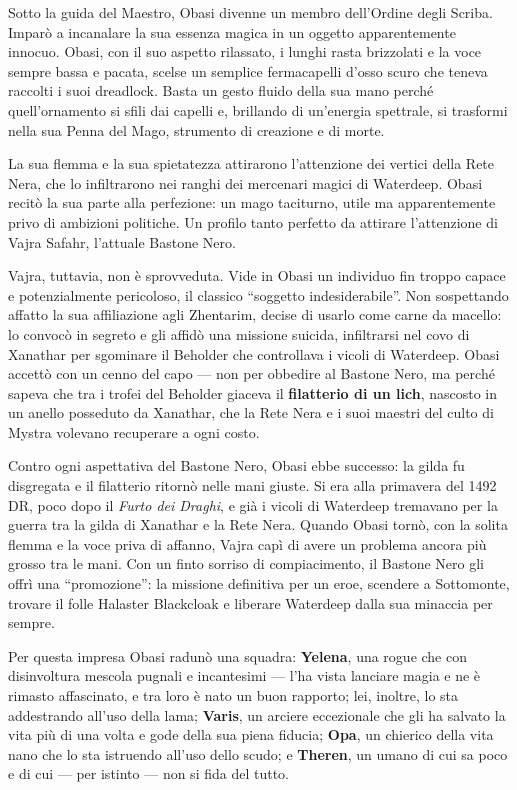 \documentclass[letterpaper,twocolumn,openany,nodeprecatedcode,justified]{dndbook}
\begin{document}
Sotto la guida del Maestro, Obasi divenne un membro dell'Ordine degli
Scriba. Imparò a incanalare la sua essenza magica in un oggetto
apparentemente innocuo. Obasi, con il suo aspetto rilassato, i lunghi
rasta brizzolati e la voce sempre bassa e pacata, scelse un semplice
fermacapelli d'osso scuro che teneva raccolti i suoi dreadlock. Basta un
gesto fluido della sua mano perché quell'ornamento si sfili dai capelli
e, brillando di un'energia spettrale, si trasformi nella sua Penna del
Mago, strumento di creazione e di morte.

La sua flemma e la sua spietatezza attirarono l'attenzione dei vertici
della Rete Nera, che lo infiltrarono nei ranghi dei mercenari magici di
Waterdeep. Obasi recitò la sua parte alla perfezione: un mago taciturno,
utile ma apparentemente privo di ambizioni politiche. Un profilo tanto
perfetto da attirare l'attenzione di Vajra Safahr, l'attuale Bastone
Nero.

Vajra, tuttavia, non è sprovveduta. Vide in Obasi un individuo fin
troppo capace e potenzialmente pericoloso, il classico ``soggetto
indesiderabile''. Non sospettando affatto la sua affiliazione agli
Zhentarim, decise di usarlo come carne da macello: lo convocò in segreto
e gli affidò una missione suicida, infiltrarsi nel covo di Xanathar per
sgominare il Beholder che controllava i vicoli di Waterdeep. Obasi
accettò con un cenno del capo --- non per obbedire al Bastone Nero, ma
perché sapeva che tra i trofei del Beholder giaceva il \textbf{filatterio
di un lich}, nascosto in un anello posseduto da Xanathar, che la Rete
Nera e i suoi maestri del culto di Mystra volevano recuperare a ogni
costo.

Contro ogni aspettativa del Bastone Nero, Obasi ebbe successo: la gilda
fu disgregata e il filatterio ritornò nelle mani giuste. Si era alla
primavera del 1492 DR, poco dopo il \emph{Furto dei Draghi}, e già i
vicoli di Waterdeep tremavano per la guerra tra la gilda di Xanathar e la
Rete Nera. Quando Obasi tornò, con la solita flemma e la voce priva di
affanno, Vajra capì di avere un problema ancora più grosso tra le mani.
Con un finto sorriso di compiacimento, il Bastone Nero gli offrì una
``promozione'': la missione definitiva per un eroe, scendere a Sottomonte,
trovare il folle Halaster Blackcloak e liberare Waterdeep dalla sua
minaccia per sempre.

Per questa impresa Obasi radunò una squadra: \textbf{Yelena}, una rogue
che con disinvoltura mescola pugnali e incantesimi --- l'ha vista
lanciare magia e ne è rimasto affascinato, e tra loro è nato un buon
rapporto; lei, inoltre, lo sta addestrando all'uso della lama;
\textbf{Varis}, un arciere eccezionale che gli ha salvato la vita più di
una volta e gode della sua piena fiducia; \textbf{Opa}, un chierico della
vita nano che lo sta istruendo all'uso dello scudo; e \textbf{Theren}, un
umano di cui sa poco e di cui --- per istinto --- non si fida del tutto.
\end{document}
